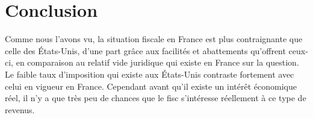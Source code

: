     \section{Conclusion}
        Comme nous l'avons vu, la situation fiscale en France est plus
        contraignante que celle des États-Unis, d'une part grâce aux
        facilités et abattements qu'offrent ceux-ci, en comparaison
        au relatif vide juridique qui existe en France sur la question.
        Le faible taux d'imposition qui existe aux États-Unis contraste
        fortement avec celui en vigueur en France. Cependant avant qu'il
        existe un intérêt économique réel, il n'y a que très peu de
        chances que le fisc s'intéresse réellement à ce type de revenus.

